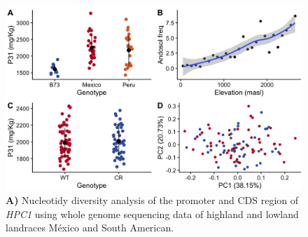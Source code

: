 \documentclass[9pt,twocolumn,twoside,lineno]{BioRxiv}
\begin{document}
\clearpage

\begin{figure}[t]
\begin{center}
\includegraphics[width=0.4\paperwidth]{Sup_Figures/Sup_Fig_6.png}
\caption{\textbf{A)} Nucleotidy diversity analysis of the promoter and CDS region of \textit{HPC1} using whole genome sequencing data of highland and lowland landraces México and South American.
}
\label{SupFig5}
\end{center}
\end{figure} 

\clearpage


\clearpage
\end{document}
